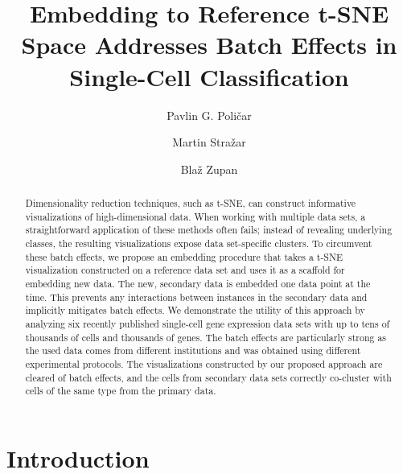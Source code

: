 \documentclass[runningheads]{llncs}
\begin{document}
%
\title{Embedding to Reference t-SNE Space Addresses Batch Effects in Single-Cell Classification}
%
%
\author{Pavlin G. Poli\v{c}ar \and
Martin Stra\v{z}ar \and
Bla\v{z} Zupan}
%
%

\maketitle

\begin{abstract}

Dimensionality reduction techniques, such as t-SNE, can construct informative
visualizations of high-dimensional data. When working with multiple data sets,
a straightforward application of these methods often fails; instead of
revealing underlying classes, the resulting visualizations expose
data set-specific clusters. To circumvent these batch effects, we propose an
embedding procedure that takes a t-SNE visualization constructed on a reference
data set and uses it as a scaffold for embedding new data. The new, secondary data is
embedded one data point at the time. This prevents any interactions
between instances in the secondary data and implicitly mitigates batch
effects. We demonstrate the utility of this approach by analyzing six
recently published single-cell gene expression data sets with up to tens
of thousands of cells and thousands of genes. The batch
effects are particularly strong as the used data comes from different institutions
and was obtained using different experimental protocols. The visualizations
constructed by our proposed approach are cleared of batch effects, and the cells
from secondary data sets correctly co-cluster with cells of the same type from the primary data. 

\end{abstract}


\section{Introduction}
\label{sec:intro}
\end{document}
